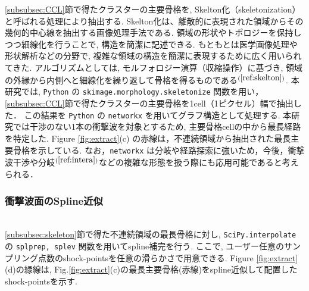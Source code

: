 \documentclass[a4j]{jarticle}
\begin{document}
\ref{subsubsec:CCL}節で得たクラスターの主要骨格を, Skelton化（skeletonization）と呼ばれる処理により抽出する.
Skelton化は、離散的に表現された領域からその幾何的中心線を抽出する画像処理手法である. 
領域の形状やトポロジーを保持しつつ細線化を行うことで, 構造を簡潔に記述できる.
もともとは医学画像処理や形状解析などの分野で, 複雑な領域の構造を簡潔に表現するために広く用いられてきた.
アルゴリズムとしては, モルフォロジー演算（収縮操作）に基づき, 領域の外縁から内側へと細線化を繰り返して骨格を得るものである$^{(\ref{ref:skelton})}$.
本研究では, \texttt{Python} の \texttt{skimage.morphology.skeletonize} 関数を用い，\ref{subsubsec:CCL}節で得たクラスターの主要骨格を1cell（1ピクセル）幅で抽出した．
この結果を \texttt{Python} の \texttt{networkx} を用いてグラフ構造として処理する.
本研究では干渉のない1本の衝撃波を対象とするため, 主要骨格cellの中から最長経路を特定した.
Figure \ref{fig:extract}(c) の赤線は，不連続領域から抽出された最長主要骨格を示している.
なお，\texttt{networkx} は分岐や経路探索に強いため，今後，衝撃波干渉や分岐$^{(\ref{ref:intera})}$などの複雑な形態を扱う際にも応用可能であると考えられる．

\subsubsection{衝撃波面のSpline近似} \label{subsubsec:spline}
\mbox{}\\[-1.0ex]

\ref{subsubsec:skeleton}節で得た不連続領域の最長骨格に対し, 
\texttt{SciPy.interpolate} の \texttt{splprep, splev} 関数を用いてspline補完を行う.
ここで, ユーザー任意のサンプリング点数のshock-pointsを任意の滑らかさで用意できる.
Figure \ref{fig:extract}(d)の緑線は, Fig.\ref{fig:extract}(c)の最長主要骨格(赤線)をspline近似して配置したshock-pointsを示す.
\end{document}
